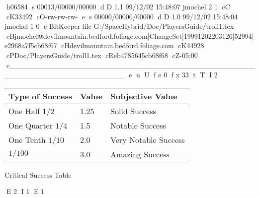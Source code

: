 h06584
s 00013/00000/00000
d D 1.1 99/12/02 15:48:07 jmochel 2 1
cC
cK33492
cO-rw-rw-rw-
e
s 00000/00000/00000
d D 1.0 99/12/02 15:48:04 jmochel 1 0
c BitKeeper file G:/SpaceHybrid/Doc/PlayersGuide/troll1.tex
cBjmochel@devilmountain.bedford.foliage.com|ChangeSet|19991202203126|52994|e2968a7f5cb68f67
cHdevilmountain.bedford.foliage.com
cK44928
cPDoc/PlayersGuide/troll1.tex
cReb4785645cb68f68
cZ-05:00
c______________________________________________________________________
e
u
U
f e 0
f x 33
t
T
I 2
\begin{SHTable}[H]
	\begin{tabular}{l|l|l}
	Type of Success				& Value & Subjective Value	\\
	\hline
	One Half \( 1/2 \)			& 1.25	& Solid Success		\\
        One Quarter \( 1/4 \) 	& 1.5	& Notable Success	\\
        One Tenth \( 1/10 \) 	& 2.0	& Very Notable Success	\\
        \(1/100\) 				& 3.0	& Amazing Success	\\
	\end{tabular}
	\caption{Critical Success Table}\label{Table:CriticalSuccess}
\end{SHTable}
E 2
I 1
E 1
